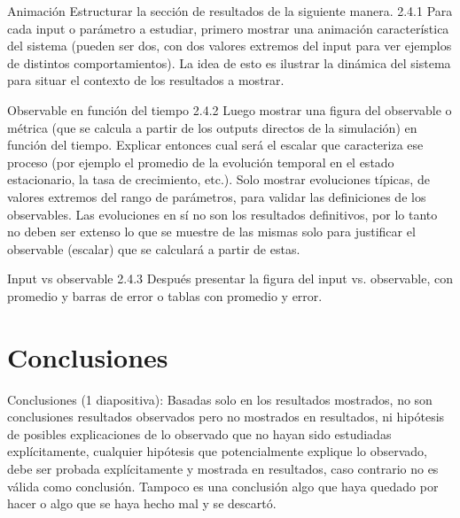 \documentclass{beamer}
\begin{document}
    \begin{frame}{Animación}
        Estructurar la sección de resultados de la siguiente manera.
        2.4.1 Para cada input o parámetro a estudiar, primero mostrar una animación característica del
        sistema (pueden ser dos, con dos valores extremos del input para ver ejemplos de distintos
        comportamientos). La idea de esto es ilustrar la dinámica del sistema para situar el contexto de los
        resultados a mostrar.
    \end{frame}

    \begin{frame}{Observable en función del tiempo}
        2.4.2 Luego mostrar una figura del observable o métrica (que se calcula a partir de los outputs
        directos de la simulación) en función del tiempo. Explicar entonces cual será el escalar que
        caracteriza ese proceso (por ejemplo el promedio de la evolución temporal en el estado
        estacionario, la tasa de crecimiento, etc.). Solo mostrar evoluciones típicas, de valores extremos
        del rango de parámetros, para validar las definiciones de los observables. Las evoluciones en sí
        no son los resultados definitivos, por lo tanto no deben ser extenso lo que se muestre de las
        mismas solo para justificar el observable (escalar) que se calculará a partir de estas.
    \end{frame}

    \begin{frame}{Input vs observable}
        2.4.3 Después presentar la figura del input vs. observable, con promedio y barras de error o tablas
        con promedio y error.
    \end{frame}


    \section{Conclusiones}

    \begin{frame}{Conclusiones}
        (1 diapositiva): Basadas solo en los resultados mostrados, no son conclusiones
        resultados observados pero no mostrados en resultados, ni hipótesis de posibles explicaciones de
        lo observado que no hayan sido estudiadas explícitamente, cualquier hipótesis que
        potencialmente explique lo observado, debe ser probada explícitamente y mostrada en resultados,
        caso contrario no es válida como conclusión. Tampoco es una conclusión algo que haya quedado
        por hacer o algo que se haya hecho mal y se descartó.
    \end{frame}
\end{document}

